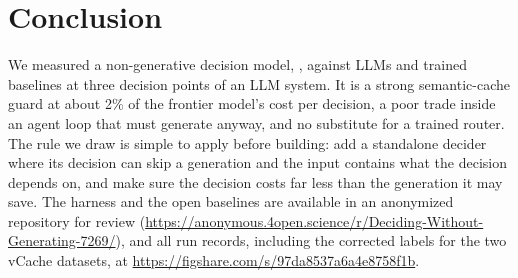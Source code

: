 \section{Conclusion}
\label{sec:conclusion}

We measured a non-generative decision model, \jev, against LLMs and trained baselines at three decision points of an LLM system.
It is a strong semantic-cache guard at about 2\% of the frontier model's cost per decision, a poor trade inside an agent loop that must generate anyway, and no substitute for a trained router.
The rule we draw is simple to apply before building: add a standalone decider where its decision can skip a generation and the input contains what the decision depends on, and make sure the decision costs far less than the generation it may save.
The harness and the open baselines are available in an anonymized repository for review (\url{https://anonymous.4open.science/r/Deciding-Without-Generating-7269/}), and all run records, including the corrected labels for the two vCache datasets, at \url{https://figshare.com/s/97da8537a6a4e8758f1b}.
